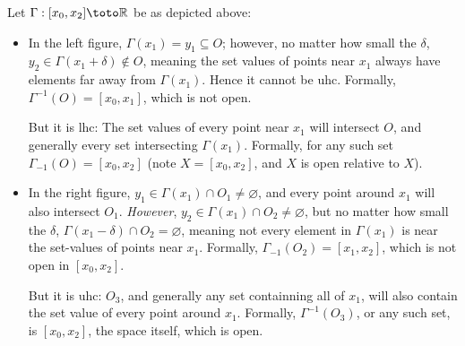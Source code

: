 \documentclass{article}
\begin{document}
\begin{figure}[!ht]
\end{figure}

Let $\Gamma: [x_0, x_2] \toto \mathbb{R}$ be as depicted above:
\begin{itemize}[label=$\bullet$]
  \item In the left figure, $\Gamma(x_1) = y_1 \subseteq O$; however, no matter how small the $\delta$, $y_2 \in \Gamma(x_1 + \delta) \notin O$, meaning the set values of points near $x_1$ always have elements far away from $\Gamma(x_1)$. Hence it cannot be uhc. Formally, $\Gamma^{-1}(O) = [x_0, x_1]$, which is not open.

    But it is lhc: The set values of every point near $x_1$ will intersect $O$, and generally every set intersecting $\Gamma(x_1)$. Formally, for any such set $\Gamma_{-1}(O) = [x_0, x_2]$ (note $X = [x_0, x_2]$, and $X$ is open relative to $X$).

  \item In the right figure, $y_1 \in \Gamma(x_1) \cap O_1 \ne \varnothing$, and every point around $x_1$ will also intersect $O_1$. \textit{However}, $y_2 \in \Gamma(x_1) \cap O_2 \ne \varnothing$, but no matter how small the $\delta$, $\Gamma(x_1 - \delta) \cap O_2 = \varnothing$, meaning not every element in $\Gamma(x_1)$ is near the set-values of points near $x_1$. Formally, $\Gamma_{-1}(O_2) = [x_1, x_2]$, which is not open in $[x_0, x_2]$.

    But it is uhc: $O_3$, and generally any set containning all of $x_1$, will also contain the set value of every point around $x_1$. Formally, $\Gamma^{-1}(O_3)$, or any such set, is $[x_0, x_2]$, the space itself, which is open.
\end{itemize}
\end{document}
